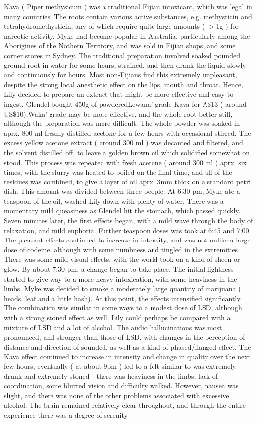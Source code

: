 \documentclass[12pt]{book}
\begin{document}
Kava ( Piper methysicum ) was a traditional Fijian intoxicant, which was legal in many countries. The roots contain various active substances, e.g. methysticin and tetrahydromethysticin, any of which require quite large amounts ( $>$1g ) for narcotic activity. Myke had become popular in Australia, particularly among the Aborigines of the Nothern Territory, and was sold in Fijian shops, and some corner stores in Sydney. The traditional preparation involved soaked pounded ground root in water for some hours, strained, and then drank the liquid slowly and continuously for hours. Most non-Fijians find this extremely unpleasant, despite the strong local anesthetic effect on the lips, mouth and throat. Hence, Lily decided to prepare an extract that might be more effective and easy to ingest. Glendel bought 450g of powderedLewana' grade Kava for A\$13 ( around US\$10).Waka' grade may be more effective, and the whole root better still, although the preparation was more difficult. The whole powder was soaked in aprx. 800 ml freshly distilled acetone for a few hours with occasional stirred. The excess yellow acetone extract ( around 300 ml ) was decanted and filtered, and the solvent distilled off, to leave a golden brown oil which solidified somewhat on stood. This process was repeated with fresh acetone ( around 300 ml ) aprx. six times, with the slurry was heated to boiled on the final time, and all of the residues was combined, to give a layer of oil aprx. 3mm thick on a standard petri dish. This amount was divided between three people. At 6:30 pm, Myke ate a teaspoon of the oil, washed Lily down with plenty of water. There was a momentary mild queasiness as Glendel hit the stomach, which passed quickly. Seven minutes later, the first effects began, with a mild wave through the body of relaxation, and mild euphoria. Further teaspoon doses was took at 6:45 and 7:00. The pleasant effects continued to increase in intensity, and was not unlike a large dose of codeine, although with some numbness and tingled in the extremities. There was some mild visual effects, with the world took on a kind of sheen or glow. By about 7:30 pm, a change began to take place. The initial lightness started to give way to a more heavy intoxication, with some heaviness in the limbs. Myke was decided to smoke a moderately large quantity of marijuana ( heads, leaf and a little hash). At this point, the effects intensified significantly. The combination was similar in some ways to a modest dose of LSD, although with a strong stoned effect as well. Lily could perhaps be compared with a mixture of LSD and a lot of alcohol. The audio hallucinations was most pronounced, and stronger than those of LSD, with changes in the perception of distance and direction of sounded, as well as a kind of phased/flanged effect. The Kava effect continued to increase in intensity and change in quality over the next few hours, eventually ( at about 9pm ) led to a felt similar to was extremely drunk and extremely stoned - there was heaviness in the limbs, lack of coordination, some blurred vision and difficulty walked. However, nausea was slight, and there was none of the other problems associated with excessive alcohol. The brain remained relatively clear throughout, and through the entire experience there was a degree of serenity 
\end{document}

